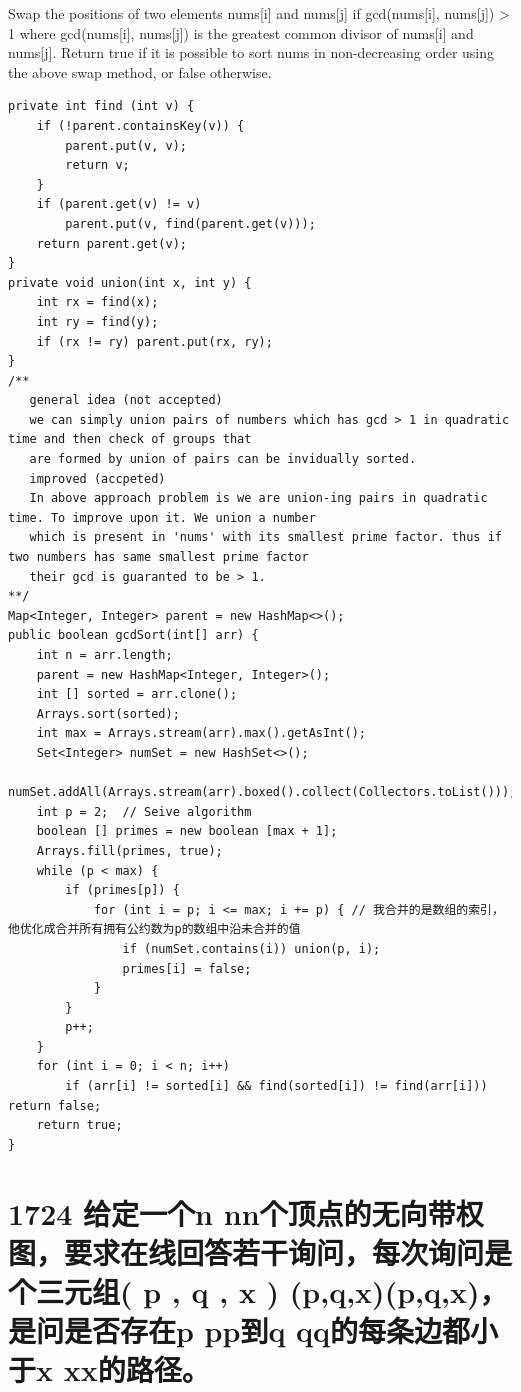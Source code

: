\documentclass[9pt, b5paaper]{book}
\begin{document}
Swap the positions of two elements nums[i] and nums[j] if gcd(nums[i], nums[j]) > 1 where gcd(nums[i], nums[j]) is the greatest common divisor of nums[i] and nums[j].
Return true if it is possible to sort nums in non-decreasing order using the above swap method, or false otherwise.
\begin{verbatim}
private int find (int v) {
    if (!parent.containsKey(v)) {
        parent.put(v, v);
        return v;
    }
    if (parent.get(v) != v)
        parent.put(v, find(parent.get(v)));
    return parent.get(v);
}
private void union(int x, int y) {
    int rx = find(x);
    int ry = find(y);
    if (rx != ry) parent.put(rx, ry);
}
/**
   general idea (not accepted)
   we can simply union pairs of numbers which has gcd > 1 in quadratic time and then check of groups that
   are formed by union of pairs can be invidually sorted. 
   improved (accpeted)
   In above approach problem is we are union-ing pairs in quadratic time. To improve upon it. We union a number
   which is present in 'nums' with its smallest prime factor. thus if two numbers has same smallest prime factor
   their gcd is guaranted to be > 1. 
**/
Map<Integer, Integer> parent = new HashMap<>();
public boolean gcdSort(int[] arr) {
    int n = arr.length;
    parent = new HashMap<Integer, Integer>();
    int [] sorted = arr.clone();
    Arrays.sort(sorted);
    int max = Arrays.stream(arr).max().getAsInt();
    Set<Integer> numSet = new HashSet<>();
    numSet.addAll(Arrays.stream(arr).boxed().collect(Collectors.toList()));
    int p = 2;  // Seive algorithm
    boolean [] primes = new boolean [max + 1];
    Arrays.fill(primes, true);
    while (p < max) {
        if (primes[p]) {
            for (int i = p; i <= max; i += p) { // 我合并的是数组的索引，他优化成合并所有拥有公约数为p的数组中沿未合并的值
                if (numSet.contains(i)) union(p, i);
                primes[i] = false;
            }
        }
        p++;
    }
    for (int i = 0; i < n; i++) 
        if (arr[i] != sorted[i] && find(sorted[i]) != find(arr[i])) return false;
    return true;
}
\end{verbatim}

\section{1724 给定一个n nn个顶点的无向带权图，要求在线回答若干询问，每次询问是个三元组( p , q , x ) (p,q,x)(p,q,x)，是问是否存在p pp到q qq的每条边都小于x xx的路径。}
\label{sec-17-7}
\end{document}
